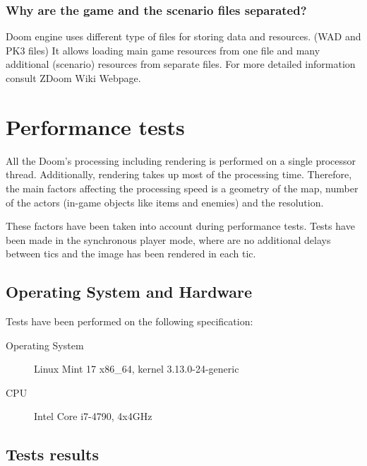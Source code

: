 \documentclass[english,bachelor,a4paper,twoside]{ppfcmthesis}
\begin{document}
\subsubsection{Why are the game and the scenario files separated?}

Doom engine uses different type of files for storing data and resources. (WAD and PK3 files) It allows loading main game resources from one file and many additional (scenario) resources from separate files. For more detailed information consult ZDoom Wiki Webpage\cite{zdoom-wiki}.

\section{Performance tests}\label{sec:performance}

All the Doom's processing including rendering is performed on a single processor thread. Additionally, rendering takes up most of the processing time. Therefore, the main factors affecting the processing speed is a geometry of the map, number of the actors (in-game objects like items and enemies) and the resolution. 

These factors have been taken into account during performance tests. Tests have been made in the synchronous player mode, where are no additional delays between tics and the image has been rendered in each tic.

	\subsection{Operating System and Hardware}
	
	Tests have been performed on the following specification:
	
	\begin{description}
		\item[Operating System] Linux Mint 17 x86\_64, kernel 3.13.0-24-generic
		\item[CPU] Intel Core i7-4790, 4x4GHz
	\end{description}

\subsection{Tests results}
\end{document}
